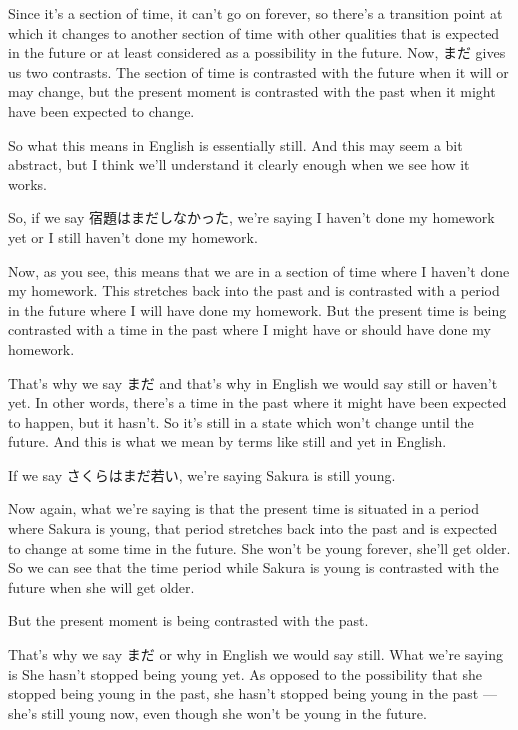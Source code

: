 Since it's a section of time, it can't go on forever, so there's a transition point at which it changes to another section of time with other qualities that is expected in the future or at least considered as a possibility in the future. Now, まだ gives us two contrasts. The section of time is contrasted with the future when it will or may change, but the present moment is contrasted with the past when it might have been expected to change.

{}

So what this means in English is essentially still. And this may seem a bit abstract, but I think we'll understand it clearly enough when we see how it works.

So, if we say 宿題はまだしなかった, we're saying I haven't done my homework yet or I still haven't done my homework.

{}

Now, as you see, this means that we are in a section of time where I haven't done my homework. This stretches back into the past and is contrasted with a period in the future where I will have done my homework. But the present time is being contrasted with a time in the past where I might have or should have done my homework.

{}

That's why we say まだ and that's why in English we would say still or haven't yet. In other words, there's a time in the past where it might have been expected to happen, but it hasn't. So it's still in a state which won't change until the future. And this is what we mean by terms like still and yet in English.

If we say さくらはまだ若い, we're saying Sakura is still young.

{}

Now again, what we're saying is that\crlf
the present time is situated in a period where Sakura is young,\crlf
that period stretches back into the past and is expected to change at some time in the future. She won't be young forever, she'll get older. So we can see that the time period while Sakura is young is contrasted with the future when she will get older.

But the present moment is being contrasted with the past.

{}

That's why we say まだ or why in English we would say still. What we're saying is She hasn't stopped being young yet. As opposed to the possibility that she stopped being young in the past, she hasn't stopped being young in the past --- she's still young now, even though she won't be young in the future.

